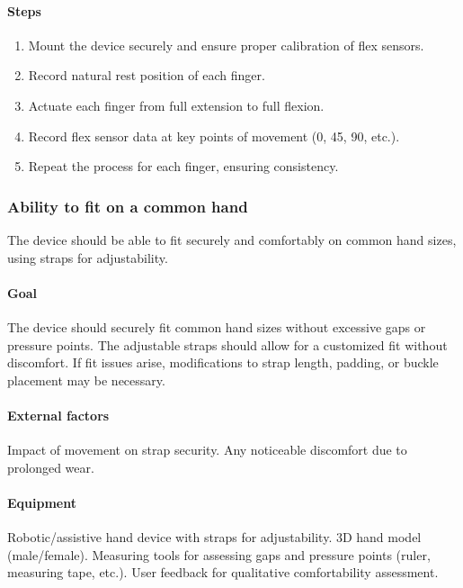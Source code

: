 \documentclass{article}
\begin{document}
\paragraph{Steps}
\begin{enumerate}
    \item Mount the device securely and ensure proper calibration of flex sensors.
    \item Record natural rest position of each finger.
    \item Actuate each finger from full extension to full flexion.
    \item Record flex sensor data at key points of movement (0, 45, 90, etc.).
    \item Repeat the process for each finger, ensuring consistency.
\end{enumerate}

\subsubsection{Ability to fit on a common hand}
The device should be able to fit securely and comfortably on common hand sizes, using straps for adjustability.

\paragraph{Goal} The device should securely fit common hand sizes without excessive gaps or pressure points. The adjustable straps should allow for a customized fit without discomfort. If fit issues arise, modifications to strap length, padding, or buckle placement may be necessary.

\paragraph{External factors} Impact of movement on strap security. Any noticeable discomfort due to prolonged wear.

\paragraph{Equipment} Robotic/assistive hand device with straps for adjustability. 3D hand model (male/female). Measuring tools for assessing gaps and pressure points (ruler, measuring tape, etc.). User feedback for qualitative comfortability assessment.
\end{document}
